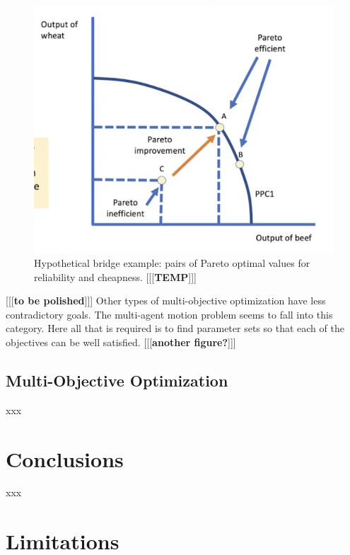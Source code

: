 \documentclass[letterpaper]{article}
\begin{document}
\begin{figure}[h]
    \includegraphics[width=\columnwidth]{images/temp_MOF.png}
    \caption{Hypothetical bridge example: pairs of Pareto optimal values for reliability and cheapness. [[[\textbf{TEMP}]]]}
    \label{fig:Pareto-front}
\end{figure}

[[[\textbf{to be polished}]]] Other types of multi-objective optimization have less contradictory goals. The multi-agent motion problem seems to fall into this category. Here all that is required is to find parameter sets so that each of the objectives can be well satisfied. [[[\textbf{another figure?}]]]

\subsection{Multi-Objective Optimization}
\label{subsec:Multi-Objective}

xxx
\par

\section{Conclusions}
\label{sec:Conclusions}

xxx
\par

\section{Limitations}
\label{sec:limitations}
\end{document}
